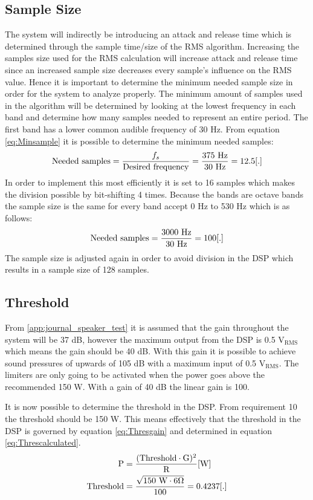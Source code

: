 \subsection*{Sample Size}
The system will indirectly be introducing an attack and release time which is determined through the sample time/size of the RMS algorithm. Increasing the samples size used for the RMS calculation will increase attack and release time since an increased sample size decreases every sample's influence on the RMS value. Hence it is important to determine the minimum needed sample size in order for the system to analyze properly. The minimum amount of samples used in the algorithm will be determined by looking at the lowest frequency in each band and determine how many samples needed to represent an entire period. The first band has a lower common audible frequency of 30 Hz. From equation \ref{eq:Minsample} it is possible to determine the minimum needed samples:
\begin{equation}\label{eq:Minsample}
\text{Needed samples} = \frac{f_s}{\text{Desired frequency}} = \frac{375 \text{ Hz}}{30 \text{ Hz}} = 12.5 \enhed{.}
\end{equation} 
In order to implement this most efficiently it is set to 16 samples which makes the division possible by bit-shifting 4 times. Because the bands are octave bands the sample size is the same for every band accept 0 Hz to 530 Hz which is as follows:
\begin{equation}
\text{Needed samples} = \frac{3000 \text{ Hz}}{30 \text{ Hz}} = 100 \enhed{.}
\end{equation} 
The sample size is adjusted again in order to avoid division in the DSP which results in a sample size of 128 samples. 

\subsection*{Threshold}
From \autoref{app:journal_speaker_test} it is assumed that the gain throughout the system will be 37 dB, however the maximum output from the DSP is 0.5 $\text{V}_\text{RMS}$ which means the gain should be 40 dB. With this gain it is possible to achieve sound pressures of upwards of 105 dB with a maximum input of 0.5 $\text{V}_\text{RMS}$. The limiters are only going to be activated when the power goes above the recommended 150 W. With a gain of 40 dB the linear gain is 100.

It is now possible to determine the threshold in the DSP. From requirement 10 the threshold should be 150 W.  This means effectively that the threshold in the DSP is governed by equation \ref{eq:Thresgain} and determined in equation \ref{eq:Threscalculated}.
\vspace{-3mm}
\begin{align}
\text{P}&=\frac{(\text{Threshold} \cdot \text{G})^2}{\text{R}} \enhed{W}\label{eq:Thresgain}
\\
\text{Threshold}&=\frac{\sqrt{150 \text{ W} \cdot 6 \Omega }}{100}=0.4237\enhed{.}\label{eq:Threscalculated}
\end{align}

